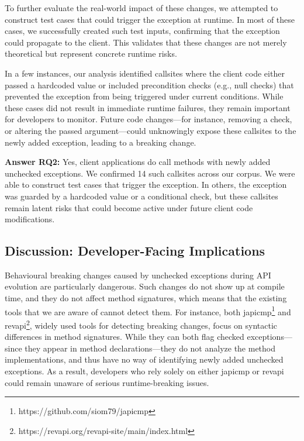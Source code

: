 To further evaluate the real-world impact of these changes, we attempted to construct test cases that could trigger the exception at runtime. In most of these cases, we successfully created such test inputs, confirming that the exception could propagate to the client. This validates that these changes are not merely theoretical but represent concrete runtime risks.

In a few instances, our analysis identified callsites where the client code either passed a hardcoded value or included precondition checks (e.g., null checks) that prevented the exception from being triggered under current conditions. While these cases did not result in immediate runtime failures, they remain important for developers to monitor. Future code changes—for instance, removing a check, or altering the passed argument—could unknowingly expose these callsites to the newly added exception, leading to a breaking change.

\vspace{1em}
\begin{tcolorbox}[colback=gray!10, colframe=black]
\textbf{Answer RQ2:} Yes, client applications do call methods with newly added unchecked exceptions. We confirmed 14 such callsites across our corpus. We were able to construct test cases that trigger the exception. In others, the exception was guarded by a hardcoded value or a conditional check, but these callsites remain latent risks that could become active under future client code modifications.
\end{tcolorbox}
\vspace{1em}

\subsection{Discussion: Developer-Facing Implications}

Behavioural breaking changes caused by unchecked exceptions during API evolution are particularly dangerous. Such changes do not show up at compile time, and they do not affect method signatures, which means that the existing tools that we are aware of cannot detect them. For instance, both japicmp\footnote{https://github.com/siom79/japicmp} and revapi\footnote{https://revapi.org/revapi-site/main/index.html}, widely used tools for detecting breaking changes, focus on syntactic differences in method signatures. While they can both flag checked exceptions—since they appear in method declarations—they do not analyze the method implementations, and thus have no way of identifying newly added unchecked exceptions. As a result, developers who rely solely on either japicmp or revapi could remain unaware of serious runtime-breaking issues.

